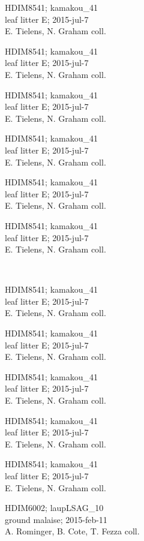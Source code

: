 \documentclass[2pt]{extarticle}
\begin{document}
\noindent
\parbox{0.16\textwidth}{\tiny \raggedright \rule[-0.3\baselineskip]{0pt}{10pt}HDIM8541; kamakou\_41\\ leaf litter E; 2015-jul-7\\ E. Tielens, N. Graham coll.}
\parbox{0.16\textwidth}{\tiny \raggedright \rule[-0.3\baselineskip]{0pt}{10pt}HDIM8541; kamakou\_41\\ leaf litter E; 2015-jul-7\\ E. Tielens, N. Graham coll.}
\parbox{0.16\textwidth}{\tiny \raggedright \rule[-0.3\baselineskip]{0pt}{10pt}HDIM8541; kamakou\_41\\ leaf litter E; 2015-jul-7\\ E. Tielens, N. Graham coll.}
\parbox{0.16\textwidth}{\tiny \raggedright \rule[-0.3\baselineskip]{0pt}{10pt}HDIM8541; kamakou\_41\\ leaf litter E; 2015-jul-7\\ E. Tielens, N. Graham coll.}
\parbox{0.16\textwidth}{\tiny \raggedright \rule[-0.3\baselineskip]{0pt}{10pt}HDIM8541; kamakou\_41\\ leaf litter E; 2015-jul-7\\ E. Tielens, N. Graham coll.}
\parbox{0.16\textwidth}{\tiny \raggedright \rule[-0.3\baselineskip]{0pt}{10pt}HDIM8541; kamakou\_41\\ leaf litter E; 2015-jul-7\\ E. Tielens, N. Graham coll.} \\ 
\vspace{0.001in} 

\noindent
\parbox{0.16\textwidth}{\tiny \raggedright \rule[-0.3\baselineskip]{0pt}{10pt}HDIM8541; kamakou\_41\\ leaf litter E; 2015-jul-7\\ E. Tielens, N. Graham coll.}
\parbox{0.16\textwidth}{\tiny \raggedright \rule[-0.3\baselineskip]{0pt}{10pt}HDIM8541; kamakou\_41\\ leaf litter E; 2015-jul-7\\ E. Tielens, N. Graham coll.}
\parbox{0.16\textwidth}{\tiny \raggedright \rule[-0.3\baselineskip]{0pt}{10pt}HDIM8541; kamakou\_41\\ leaf litter E; 2015-jul-7\\ E. Tielens, N. Graham coll.}
\parbox{0.16\textwidth}{\tiny \raggedright \rule[-0.3\baselineskip]{0pt}{10pt}HDIM8541; kamakou\_41\\ leaf litter E; 2015-jul-7\\ E. Tielens, N. Graham coll.}
\parbox{0.16\textwidth}{\tiny \raggedright \rule[-0.3\baselineskip]{0pt}{10pt}HDIM8541; kamakou\_41\\ leaf litter E; 2015-jul-7\\ E. Tielens, N. Graham coll.}
\parbox{0.16\textwidth}{\tiny \raggedright \rule[-0.3\baselineskip]{0pt}{10pt}HDIM6002; laupLSAG\_10\\ ground malaise; 2015-feb-11\\ A. Rominger, B. Cote, T. Fezza coll.} \\ 
\vspace{0.001in} 
\end{document}

